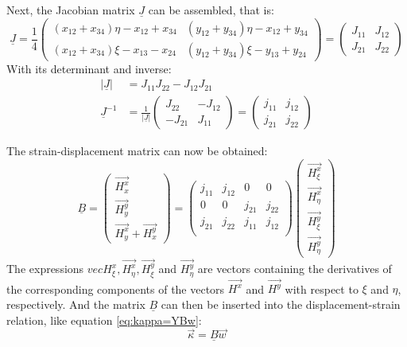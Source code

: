   Next, the Jacobian matrix $\underline{J}$ can be assembled, that is:
  \begin{equation}
  \underline{J} = \frac{1}{4} \begin{pmatrix}
  (x_{12}+x_{34})\eta - x_{12} + x_{34} & (y_{12} + y_{34})\eta - x_{12} + y_{34}\\
  (x_{12}+x_{34})\xi  - x_{13} - x_{24} & (y_{12} + y_{34})\xi  - y_{13} + y_{24}
  \end{pmatrix} = \begin{pmatrix}
  J_{11} & J_{12}\\ J_{21} & J_{22}
  \end{pmatrix}
  \end{equation}
  With its determinant and inverse:
  \begin{align}
  \left|\underline{J}\right| &= J_{11} J_{22} - J_{12} J_{21}\\
  \underline{J}^{-1} &= \frac{1}{\left|\underline{J}\right|} \begin{pmatrix}
  J_{22} & -J_{12}\\ -J_{21} & J_{11}
  \end{pmatrix} = \begin{pmatrix}
  j_{11} & j_{12}\\ j_{21} & j_{22}
  \end{pmatrix}
  \end{align}
  
  The strain-displacement matrix can now be obtained:
  \begin{equation}
  \underline{B} = \begin{pmatrix}
  \vec{H_x^x}\\\vec{H_y^y}\\\vec{H_y^x}+\vec{H_x^y}
  \end{pmatrix} = \begin{pmatrix}
  j_{11} & j_{12} & 0 & 0\\
  0 & 0 & j_{21} & j_{22}\\
  j_{21} & j_{22} & j_{11} & j_{12}\\
  \end{pmatrix} \begin{pmatrix}
  \vec{H_\xi^x}\\\vec{H_\eta^x}\\\vec{H_\xi^y}\\\vec{H_\eta^y}
  \end{pmatrix}
  \end{equation}
  The expressions $vec{H_\xi^x}, \vec{H_\eta^x}, \vec{H_\xi^y}$ and $\vec{H_\eta^y}$ are vectors containing the derivatives of the corresponding components of the vectors $\vec{H^x}$ and $\vec{H^y}$ with respect to $\xi$ and $\eta$, respectively.
  And the matrix $\underline{B}$ can then be inserted into the displacement-strain relation, like equation \ref{eq:kappa=YBw}:
  \begin{equation}
  \vec{\kappa} = \underline{B} \vec{w}
  \end{equation}
  

